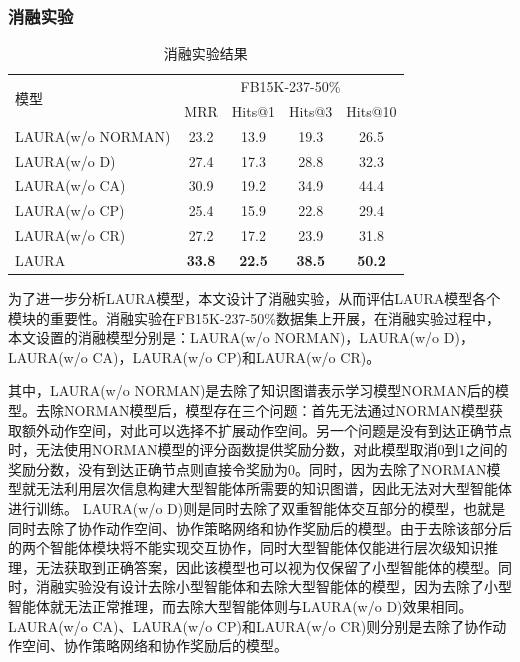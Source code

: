 \documentclass[algorithmlist, AutoFakeBold, AutoFakeSlant, figurelist, tablelist, nomlist, engineering, openany]{seuthesix} %
\begin{document}
\subsubsection{消融实验}
\begin{table}[t]
  \centering
  \caption{消融实验结果}
  \begin{tabular*}{0.95\textwidth}{@{\extracolsep{\fill}}lcccc}
    \toprule[1pt]
    \multirow{2}{*}{模型} & \multicolumn{4}{c}{FB15K-237-50\%} \\
      & MRR & Hits@1 & Hits@3 & Hits@10 \\ \hline
    LAURA(w/o NORMAN) & 23.2 & 13.9 & 19.3 & 26.5 \\
    LAURA(w/o D) & 27.4 & 17.3 & 28.8 & 32.3 \\
    LAURA(w/o CA) & 30.9 & 19.2 & 34.9 & 44.4 \\
    LAURA(w/o CP) & 25.4 & 15.9 & 22.8 & 29.4 \\
    LAURA(w/o CR) & 27.2 & 17.2 & 23.9 & 31.8 \\
    LAURA & \textbf{33.8} & \textbf{22.5} & \textbf{38.5} & \textbf{50.2} \\
    \bottomrule[1pt]
  \end{tabular*}
  \label{Experiment2_ablation}
\end{table}

为了进一步分析LAURA模型，本文设计了消融实验，从而评估LAURA模型各个模块的重要性。消融实验在FB15K-237-50\%数据集上开展，在消融实验过程中，本文设置的消融模型分别是：LAURA(w/o NORMAN)，LAURA(w/o D)，LAURA(w/o CA)，LAURA(w/o CP)和LAURA(w/o CR)。

其中，LAURA(w/o NORMAN)是去除了知识图谱表示学习模型NORMAN后的模型。去除NORMAN模型后，模型存在三个问题：首先无法通过NORMAN模型获取额外动作空间，对此可以选择不扩展动作空间。另一个问题是没有到达正确节点时，无法使用NORMAN模型的评分函数提供奖励分数，对此模型取消0到1之间的奖励分数，没有到达正确节点则直接令奖励为0。同时，因为去除了NORMAN模型就无法利用层次信息构建大型智能体所需要的知识图谱，因此无法对大型智能体进行训练。
LAURA(w/o D)则是同时去除了双重智能体交互部分的模型，也就是同时去除了协作动作空间、协作策略网络和协作奖励后的模型。由于去除该部分后的两个智能体模块将不能实现交互协作，同时大型智能体仅能进行层次级知识推理，无法获取到正确答案，因此该模型也可以视为仅保留了小型智能体的模型。同时，消融实验没有设计去除小型智能体和去除大型智能体的模型，因为去除了小型智能体就无法正常推理，而去除大型智能体则与LAURA(w/o D)效果相同。
LAURA(w/o CA)、LAURA(w/o CP)和LAURA(w/o CR)则分别是去除了协作动作空间、协作策略网络和协作奖励后的模型。
\end{document}
